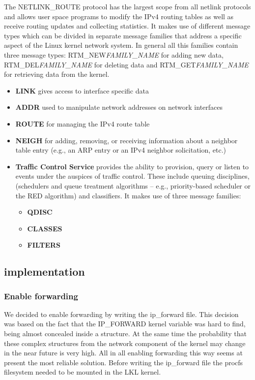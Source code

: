 {{The NETLINK_ROUTE protocol has the largest scope from all netlink protocols and allows user space programs to modify the IPv4 routing tables as well as receive routing updates and collecting statistics. It makes use of  different message types which can be divided in separate message families that address a specific aspect of the Linux kernel network system. In general all this families contain three message types: RTM_NEW\textit{FAMILY_NAME} for adding new data, RTM_DEL\textit{FAMILY_NAME} for deleting data and RTM_GET\textit{FAMILY_NAME} for retrieving data from the kernel.
\begin{itemize}
\item{\bf LINK} gives access to interface specific data
\item{\bf ADDR} used to manipulate network addresses on network interfaces
\item{\bf ROUTE} for managing the IPv4 route table
\item{\bf NEIGH} for adding, removing, or receiving information about a neighbor table entry (e.g., an ARP entry or an IPv4 neighbor solicitation, etc.)
\item \textbf{Traffic Control Service} provides the ability to provision, query or listen to
   events under the auspices of traffic control.  These include queuing
   disciplines, (schedulers and queue treatment algorithms -- e.g.,
   priority-based scheduler or the RED algorithm) and classifiers. It makes use of three message families:
\begin{itemize} 
\item{\bf QDISC}
\item{\bf CLASSES}
\item{\bf FILTERS}
\end{itemize}
\end{itemize} 

\subsection{\project implementation}
\label{sub-sec:router-lklnet}
\subsubsection{Enable forwarding}
We decided to enable forwarding by writing the ip_forward file. This decision was based on the fact that the IP_FORWARD kernel variable was hard to find, being almost concealed inside a structure. At the same time the probability that these complex structures from the network component of the kernel may change in the near future is very high. All in all enabling forwarding this way seems at present the most reliable solution.
Before writing the ip_forward file the procfs filesystem needed to be mounted in the LKL kernel. 

}}
